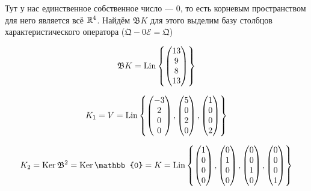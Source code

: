 \documentclass[12pt, a4paper]{article}
\begin{document}
    Тут у нас единственное собственное число — $0$, то есть корневым пространством для него является всё ${\mathbb{R}}^4$.
    Найдём $\mathfrak{B}K$ для этого выделим базу столбцов характеристического оператора ($\mathfrak{Q}- 0 \mathcal{E} = \mathfrak{Q}$)

    \begin{equation}
        \mathfrak{B}K = \operatorname{Lin} \left\{ \begin{pmatrix} 13 \\ 9 \\ 8 \\ 13 \end{pmatrix} \right\}
    \end{equation}

    \begin{equation}
        K_1 = V = \operatorname{Lin} \left\{\begin{pmatrix} -3\\2\\0\\0 \end{pmatrix}, \begin{pmatrix} 5\\0\\2\\0 \end{pmatrix}, \begin{pmatrix} 1\\0\\0\\2 \end{pmatrix} \right\}
    \end{equation}

    \begin{equation}
        K_2 = \Ker \mathfrak{B}^2 = \Ker \mathbb{0} = K = \Lin \left\{ \begin{pmatrix} 1\\0\\0\\0 \end{pmatrix}, \begin{pmatrix} 0\\1\\0\\0 \end{pmatrix}, \begin{pmatrix} 0\\0\\1\\0 \end{pmatrix}, \begin{pmatrix} 0\\0\\0\\1 \end{pmatrix}  \right\}
    \end{equation}
\end{document}
